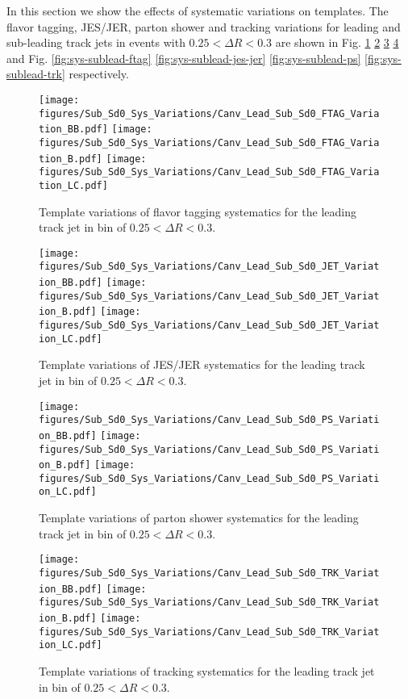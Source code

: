 In this section we show the effects of systematic variations on \subsdzero templates. The flavor tagging, JES/JER, parton shower and tracking variations for leading and sub-leading track jets in events with $0.25<\Delta R<0.3$ are shown in Fig. \ref{fig:sys-lead-ftag} \ref{fig:sys-lead-jes-jer} \ref{fig:sys-lead-ps} \ref{fig:sys-lead-trk} and Fig. \ref{fig:sys-sublead-ftag} \ref{fig:sys-sublead-jes-jer} \ref{fig:sys-sublead-ps} \ref{fig:sys-sublead-trk} respectively.

\begin{figure}[htbp]
  \centering
 \texttt{[image: figures/Sub\_Sd0\_Sys\_Variations/Canv\_Lead\_Sub\_Sd0\_FTAG\_Variation\_BB.pdf]}
 \texttt{[image: figures/Sub\_Sd0\_Sys\_Variations/Canv\_Lead\_Sub\_Sd0\_FTAG\_Variation\_B.pdf]}
 \texttt{[image: figures/Sub\_Sd0\_Sys\_Variations/Canv\_Lead\_Sub\_Sd0\_FTAG\_Variation\_LC.pdf]}
\caption{Template \subsdzero variations of flavor tagging systematics for the leading track jet in bin of $0.25<\Delta R<0.3$. }
  \label{fig:sys-lead-ftag}
\end{figure}

\begin{figure}[htbp]
  \centering
 \texttt{[image: figures/Sub\_Sd0\_Sys\_Variations/Canv\_Lead\_Sub\_Sd0\_JET\_Variation\_BB.pdf]}
 \texttt{[image: figures/Sub\_Sd0\_Sys\_Variations/Canv\_Lead\_Sub\_Sd0\_JET\_Variation\_B.pdf]}
 \texttt{[image: figures/Sub\_Sd0\_Sys\_Variations/Canv\_Lead\_Sub\_Sd0\_JET\_Variation\_LC.pdf]}
\caption{Template \subsdzero variations of JES/JER systematics for the leading track jet in bin of $0.25<\Delta R<0.3$. }
  \label{fig:sys-lead-jes-jer}
\end{figure}

\begin{figure}[htbp]
  \centering
 \texttt{[image: figures/Sub\_Sd0\_Sys\_Variations/Canv\_Lead\_Sub\_Sd0\_PS\_Variation\_BB.pdf]}
 \texttt{[image: figures/Sub\_Sd0\_Sys\_Variations/Canv\_Lead\_Sub\_Sd0\_PS\_Variation\_B.pdf]}
 \texttt{[image: figures/Sub\_Sd0\_Sys\_Variations/Canv\_Lead\_Sub\_Sd0\_PS\_Variation\_LC.pdf]}
\caption{Template \subsdzero variations of parton shower systematics for the leading track jet in bin of $0.25<\Delta R<0.3$. }
  \label{fig:sys-lead-ps}
\end{figure}


\begin{figure}[htbp]
  \centering
 \texttt{[image: figures/Sub\_Sd0\_Sys\_Variations/Canv\_Lead\_Sub\_Sd0\_TRK\_Variation\_BB.pdf]}
 \texttt{[image: figures/Sub\_Sd0\_Sys\_Variations/Canv\_Lead\_Sub\_Sd0\_TRK\_Variation\_B.pdf]}
 \texttt{[image: figures/Sub\_Sd0\_Sys\_Variations/Canv\_Lead\_Sub\_Sd0\_TRK\_Variation\_LC.pdf]}
\caption{Template \subsdzero variations of tracking systematics for the leading track jet in bin of $0.25<\Delta R<0.3$. }
  \label{fig:sys-lead-trk}
\end{figure}



